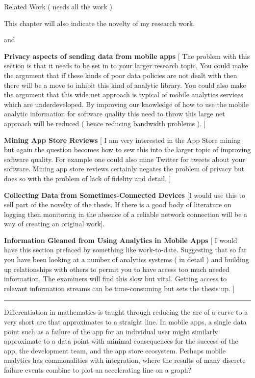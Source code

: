Related Work ( needs all the work ) 

This chapter will also indicate the novelty of my research work.

and

\textbf{Privacy aspects of sending data from mobile apps} [ The problem with this section is that it needs to be set in to your larger research topic. You could make the argument that if these kinds of poor data policies are not dealt with then there will be a move to inhibit this kind of analytic library. You could also make the argument that this wide net approach is typical of mobile analytics services which are underdeveloped. By improving our knowledge of how to use the mobile analytic information for software quality this need to throw this large net approach will be reduced ( hence reducing bandwidth problems ). ] 


\textbf{Mining App Store Reviews} [ I am very interested in the App Store mining but again the question becomes how to sew this into the larger topic of improving software quality. For example one could also mine Twitter for tweets about your software.  Mining app store reviews certainly negates the problem of privacy but does so with the problem of lack of fidelity and detail. ] 


\textbf{Collecting Data from Sometimes-Connected Devices} [I would use this to sell part of the novelty of the thesis. If there is a good body of literature on logging then monitoring in the absence of a reliable network connection will be a way of creating an original work]. 


\textbf{Information Gleaned from Using Analytics in Mobile Apps} [ I would have this section prefaced by something like work-to-date. Suggesting that so far you have been looking at a number of analytics systems ( in detail ) and building up relationships with others to permit you to have access too much needed information. The examiners will find this slow but vital. Getting access to relevant information streams can be time-consuming but sets the thesis up. ]

\noindent
\rule{\textwidth}{0.4pt}

Differentiation in mathematics is taught through reducing the arc of a curve to a very short arc that approximates to a straight line. In mobile apps, a single data point such as a failure of the app for an individual user might similarly approximate to a data point with minimal consequences for the success of the app, the development team, and the app store ecosystem. Perhaps mobile analytics has commonalities with integration, where the results of many discrete failure events combine to plot an accelerating line on a graph?

